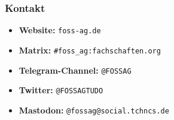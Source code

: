 \documentclass[12pt,utf8]{beamer}
\begin{document}
	
	\begin{frame}
		\frametitle{Kontakt}

		
		\begin{itemize}%
			\item \textbf{Website:} \texttt{foss-ag.de}
			\vspace{0.5cm}
			\item \textbf{Matrix:} \texttt{\#foss\_ag:fachschaften.org}
			\vspace{0.5cm}
			\item \textbf{Telegram-Channel:} \texttt{@FOSSAG}
			\vspace{0.5cm}
			\item \textbf{Twitter:} \texttt{@FOSSAGTUDO}
			\vspace{0.5cm}
			\item \textbf{Mastodon:} \texttt{@fossag@social.tchncs.de}	
			
		\end{itemize}
	\end{frame}
\end{document}
